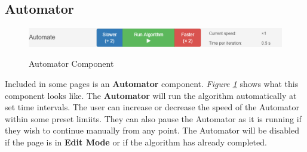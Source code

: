 \subsection{Automator}
\begin{figure}[H]
  \caption{Automator Component}
  \includegraphics[width=\linewidth]
  {images/reusable-components/automator.png}
  \label{fig-automator}
  \centering
\end{figure}
Included in some pages is an \textbf{Automator} component. 
\textit{Figure \ref{fig-automator}} shows what this component looks like. 
The \textbf{Automator} will run the algorithm automatically at set time intervals. 
The user can increase or decrease the speed of the Automator within some 
preset limiits. They can also pause the Automator as it is running if they wish
to continue manually from any point. The Automator will be disabled
if the page is in \textbf{Edit Mode} or if the algorithm has already completed.

